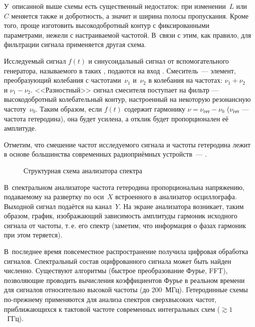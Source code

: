 \experiment

У~описанной выше схемы есть существенный недостаток: при изменении~$L$ или~$C$
меняется также и добротность, а значит и ширина полосы пропускания.
Кроме того, проще изготовить высокодобротный контур с фиксированными параметрами,
нежели с настраиваемой частотой. В~связи с этим, как правило, для фильтрации сигнала
применяется другая схема.

Исследуемый сигнал $f(t)$ и синусоидальный сигнал от вспомогательного генератора,
называемого в таких , подаются на вход . 
Смеситель~--- элемент, преобразующий колебания с частотами~$\nu_1$
и~$\nu_2$ в колебания на 
частотах: $\nu_1 + \nu_2$ и $\nu_1 - \nu_2$.
<<Разностный>> сигнал смесителя поступает на фильтр ---
высокодобротный колебательный контур, настроенный на некоторую 
резонансную частоту~$\nu_0$. Таким образом, если $f(t)$ содержит гармонику
$\nu=\nu_{гет}-\nu_0$ ($\nu_{гет}$ --- частота гетеродина), 
она будет усилена, а отклик будет пропорционален её амплитуде.

Отметим, что смешение частот исследуемого сигнала и частоты гетеродина лежит в
основе большинства современных радиоприёмных устройств~---
.

\begin{figure}[h!]
\centering
{}
\caption{Структурная схема анализатора спектра}
\end{figure}

В~спектральном анализаторе частота гетеродина пропорциональна напряжению,
подаваемому на развертку по оси~$X$ встроенного в анализатор осциллографа.
Выходной сигнал подаётся на канал~$Y$. На экране анализатора возникает, таким
образом, график, изображающий зависимость амплитуды гармоник исходного сигнала
от частоты, т.\,е. его спектр (заметим, что информация о фазах гармоник при этом
теряется).

В~последнее время повсеместное распространение получила цифровая обработка
сигналов. Спектральный состав оцифрованного сигнала может быть найден численно.
Существуют алгоритмы (быстрое преобразование Фурье, FFT), позволяющие проводить
вычисления коэффициентов Фурье в реальном времени для сигналов относительно
высокой частоты (до 200~МГц). Гетеродинные схемы по-прежнему
применяются для анализа спектров сверхвысоких частот, приближающихся
к тактовой частоте современных интегральных схем ($\gtrsim1$~ГГц).

